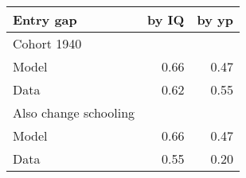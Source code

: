 \begin{tabular}{lrr}
\hline
Entry gap & by IQ  & by yp  \\
\hline
Cohort 1940 &   &   \\
Model & 0.66  & 0.47  \\
Data & 0.62  & 0.55  \\
Also change schooling &   &   \\
Model & 0.66  & 0.47  \\
Data & 0.55  & 0.20  \\
\hline
\end{tabular}%

